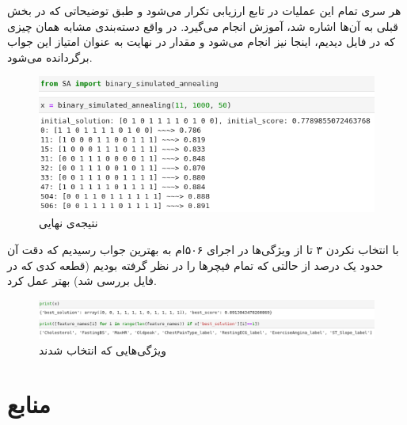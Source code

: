 \documentclass{article}
\begin{document}
\begin{multicols}{2}
هر سری تمام این عملیات در تابع ارزیابی تکرار می‌شود و طبق توضیحاتی که در بخش قبلی به آن‌ها اشاره شد، آموزش انجام می‌گیرد. در واقع دسته‌بندی مشابه همان چیزی که در فایل
دیدیم، اینجا نیز انجام می‌شود و مقدار
در نهایت به عنوان امتیاز این جواب برگردانده می‌شود.

\begin{figure}[H]
    \centering
    \includegraphics[width=0.99\linewidth]{Photos/SA/finalresult.png}
    \caption{
    نتیجه‌ی نهایی
    }
    \label{fig:my_label}
\end{figure}
با انتخاب نکردن ۳ تا از ویژگی‌ها در اجرای ۵۰۶ام به بهترین جواب رسیدیم که دقت آن حدود یک درصد از حالتی که تمام فیچرها را در نظر گرفته بودیم (قطعه کدی که در فایل
بررسی شد) بهتر عمل کرد.

\begin{figure}[H]
    \centering
    \includegraphics[width=0.99\linewidth]{Photos/SA/featuresfinal.png}
    \caption{
    ویژگی‌هایی که انتخاب شدند
    }
    \label{fig:my_label}
\end{figure}

\section{
منابع
}
\\

\end{multicols}
\end{document}

